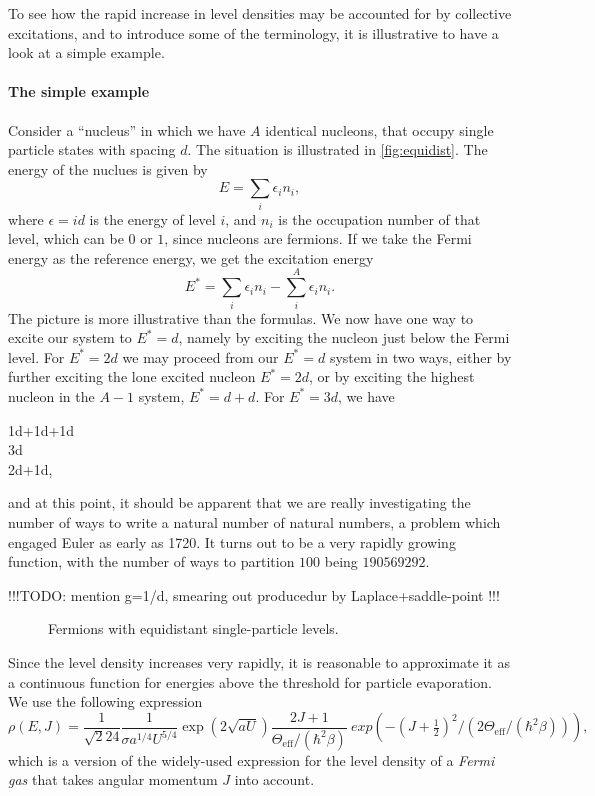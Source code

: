 To see how the rapid increase in level densities may be accounted for by collective excitations, and to introduce some of the terminology, it is illustrative to have a look at a simple example.

\paragraph{The simple example}
Consider a ``nucleus'' in which we have $A$ identical nucleons, that occupy single particle states with spacing $d$. The situation is illustrated in \autoref{fig:equidist}. The energy of the nuclues is given by 
\begin{equation}
E=\sum_i \epsilon_i n_i,
\end{equation}
where $\epsilon = id$ is the energy of level $i$, and $n_i$ is the occupation number of that level, which can be $0$ or $1$, since nucleons are fermions.
If we take the Fermi energy as the reference energy, we get the excitation energy
\begin{equation}
E^*=\sum_i \epsilon_i n_i - \sum_i^A \epsilon_i n_i.
\end{equation}
The picture is more illustrative than the formulas. We now have one way to excite our system to $E^*=d$, namely by exciting the nucleon just below the Fermi level. For $E^*=2d$ we may proceed from our $E^*=d$ system in two ways, either by further exciting the lone excited nucleon $E^* = 2d$, or by exciting the highest nucleon in the $A-1$ system, $E^*=d+d$. For $E^*=3d$, we have
\begin{aligned*}
1d+1d+1d \\
3d \\
2d+1d,
\end{aligned*}
and at this point, it should be apparent that we are really investigating the number of ways to write a natural number of natural numbers, a problem which engaged Euler as early as 1720\cite{mathworld}. It turns out to be a very rapidly growing function, with the number of ways to partition $100$ being $190 569 292$\cite{mathworld}.

!!!TODO: mention g=1/d,  smearing out producedur by Laplace+saddle-point !!!

\begin{figure}

\caption{\label{fig:equidist} Fermions with equidistant single-particle levels.}
\end{figure}

Since the level density increases very rapidly, it is reasonable to approximate it as a continuous function  for energies above the threshold for particle evaporation.
We use the following expression
\begin{equation}
\rho(E,J) = \frac{1}{\sqrt{2}24}
\frac{1}{\sigma a^{1/4} U^{5/4}} \exp{(2\sqrt{aU})}
\frac{2J+1}{\Theta_\text{eff}/(\hbar^2\beta)}\ exp{\left(-(J+\tfrac{1}{2})^2/(2\Theta_\text{eff}/(\hbar^2\beta))\right)},\label{eq:rho}
\end{equation}
which is a version of the widely-used expression for the level density of a \emph{Fermi gas} that takes angular momentum $J$ into account\cite{ripl:2006}.

